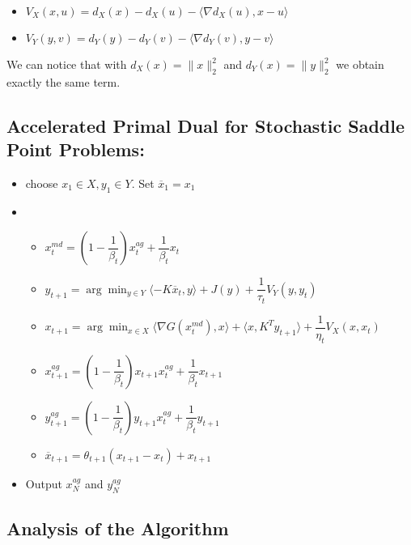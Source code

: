 \documentclass[10pt]{article}
\begin{document}
\begin{itemize}
\item $V_{X}(x,u) = d_{X}(x) -  d_{X}(u) - \langle \nabla d_{X}(u),x - u \rangle$
\item $V_{Y}(y,v) = d_{Y}(y) -  d_{Y}(v) - \langle \nabla d_{Y}(v),y - v \rangle$
\end{itemize}

We can notice that with $d_{X}(x) = \lVert x \rVert_{2}^{2}$ and $d_{Y}(x) = \lVert y \rVert_{2}^{2}$ we obtain exactly the same term.

\subsection{Accelerated Primal Dual for Stochastic Saddle Point Problems:}

\begin{itemize}
\item choose $x_{1} \in X, y_{1} \in Y$. Set $\overline{x}_{1} = x_{1}$
\item

\begin{itemize}
\item $x_{t}^{md} = (1 - \dfrac{1}{\beta_{t}})x_{t}^{ag} +  \dfrac{1}{\beta_{t}}x_{t}$
\item $y_{t+1} = \arg\min_{y \in Y} \langle -K\overline{x}_{t},y\rangle + J(y) + \dfrac{1}{\tau_{t}}V_{Y}(y,y_{t})$
\item $x_{t+1} = \arg\min_{x \in X} \langle \nabla G(x_{t}^{md}) ,x \rangle + \langle x,K^{T}y_{t+1} \rangle + \dfrac{1}{\eta_{t}}V_{X}(x,x_{t})$
\item $x_{t+1}^{ag} = (1 -  \dfrac{1}{\beta_{t}})x_{t+1}x_{t}^{ag}+ \dfrac{1}{\beta_{t}}x_{t+1}$
\item $y_{t+1}^{ag} = (1 -  \dfrac{1}{\beta_{t}})y_{t+1}x_{t}^{ag}+ \dfrac{1}{\beta_{t}}y_{t+1}$
\item $\overline{x}_{t+1} = \theta_{t+1}(x_{t+1} - x_{t}) + x_{t+1}$
\end{itemize}

\item Output $x_{N}^{ag}$ and $y_{N}^{ag}$
\end{itemize}

\subsection{Analysis of the Algorithm}
\end{document}
